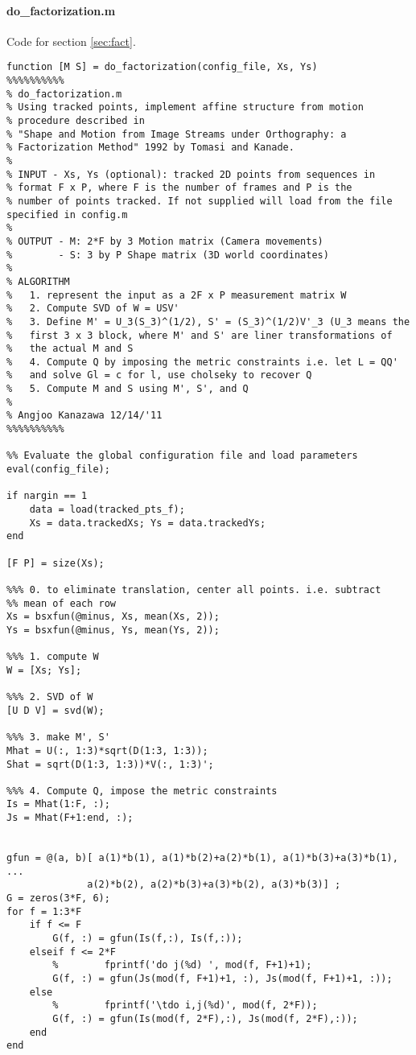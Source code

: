 \paragraph{do\_factorization.m}
Code for section \ref{sec:fact}.
\begin{verbatim}
function [M S] = do_factorization(config_file, Xs, Ys)
%%%%%%%%%%
% do_factorization.m
% Using tracked points, implement affine structure from motion
% procedure described in
% "Shape and Motion from Image Streams under Orthography: a
% Factorization Method" 1992 by Tomasi and Kanade.
%
% INPUT - Xs, Ys (optional): tracked 2D points from sequences in
% format F x P, where F is the number of frames and P is the
% number of points tracked. If not supplied will load from the file specified in config.m
% 
% OUTPUT - M: 2*F by 3 Motion matrix (Camera movements)
%        - S: 3 by P Shape matrix (3D world coordinates)
%
% ALGORITHM 
%   1. represent the input as a 2F x P measurement matrix W 
%   2. Compute SVD of W = USV'
%   3. Define M' = U_3(S_3)^(1/2), S' = (S_3)^(1/2)V'_3 (U_3 means the
%   first 3 x 3 block, where M' and S' are liner transformations of
%   the actual M and S
%   4. Compute Q by imposing the metric constraints i.e. let L = QQ' 
%   and solve Gl = c for l, use cholseky to recover Q
%   5. Compute M and S using M', S', and Q
%  
% Angjoo Kanazawa 12/14/'11
%%%%%%%%%%

%% Evaluate the global configuration file and load parameters
eval(config_file);

if nargin == 1
    data = load(tracked_pts_f);
    Xs = data.trackedXs; Ys = data.trackedYs;
end

[F P] = size(Xs); 

%%% 0. to eliminate translation, center all points. i.e. subtract
%% mean of each row
Xs = bsxfun(@minus, Xs, mean(Xs, 2));
Ys = bsxfun(@minus, Ys, mean(Ys, 2));

%%% 1. compute W
W = [Xs; Ys];

%%% 2. SVD of W
[U D V] = svd(W);

%%% 3. make M', S' 
Mhat = U(:, 1:3)*sqrt(D(1:3, 1:3)); 
Shat = sqrt(D(1:3, 1:3))*V(:, 1:3)';

%%% 4. Compute Q, impose the metric constraints
Is = Mhat(1:F, :);
Js = Mhat(F+1:end, :);


gfun = @(a, b)[ a(1)*b(1), a(1)*b(2)+a(2)*b(1), a(1)*b(3)+a(3)*b(1), ...
              a(2)*b(2), a(2)*b(3)+a(3)*b(2), a(3)*b(3)] ;
G = zeros(3*F, 6);
for f = 1:3*F
    if f <= F
        G(f, :) = gfun(Is(f,:), Is(f,:));
    elseif f <= 2*F
        %        fprintf('do j(%d) ', mod(f, F+1)+1);
        G(f, :) = gfun(Js(mod(f, F+1)+1, :), Js(mod(f, F+1)+1, :));
    else
        %        fprintf('\tdo i,j(%d)', mod(f, 2*F));
        G(f, :) = gfun(Is(mod(f, 2*F),:), Js(mod(f, 2*F),:));
    end
end


\end{verbatim}
